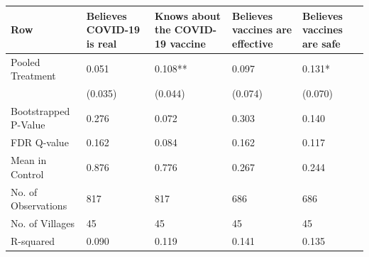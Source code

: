 
\begin{tabular}{lllll}
\toprule
Row & Believes COVID-19 is real & Knows about the COVID-19 vaccine & Believes vaccines are effective & Believes vaccines are safe\\
\midrule
Pooled Treatment & 0.051 & 0.108** & 0.097 & 0.131*\\
 & (0.035) & (0.044) & (0.074) & (0.070)\\
Bootstrapped P-Value & 0.276 & 0.072 & 0.303 & 0.140\\
FDR Q-value & 0.162 & 0.084 & 0.162 & 0.117\\
Mean in Control & 0.876 & 0.776 & 0.267 & 0.244\\
\addlinespace
No. of Observations & 817 & 817 & 686 & 686\\
No. of Villages & 45 & 45 & 45 & 45\\
R-squared & 0.090 & 0.119 & 0.141 & 0.135\\
\bottomrule
\end{tabular}
